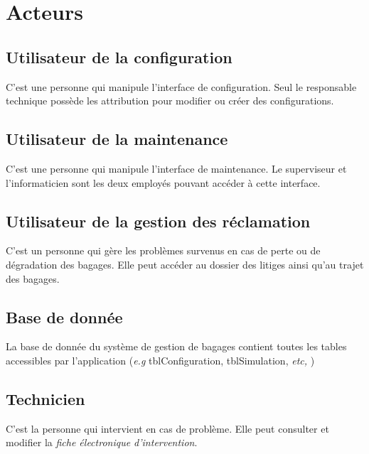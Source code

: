 \section{Acteurs}
\subsection{Utilisateur de la configuration}
C'est une personne qui manipule l'interface de configuration. Seul le responsable technique possède les attribution pour modifier ou créer des configurations.

\subsection{Utilisateur de la maintenance}
C'est une personne qui manipule l'interface de maintenance. Le superviseur et l'informaticien sont les deux employés pouvant accéder à cette interface.

\subsection{Utilisateur de la gestion des réclamation}
C'est un personne qui gère les problèmes survenus en cas de perte ou de dégradation des bagages. Elle peut accéder au dossier des litiges ainsi qu'au trajet des bagages.

\subsection{Base de donnée}
La base de donnée du système de gestion de bagages contient toutes les tables accessibles par l'application (\textsl{e.g} tblConfiguration, tblSimulation, \textsl{etc,} )


\subsection{Technicien}
C'est la personne qui intervient en cas de problème. Elle peut consulter et modifier la \textsl{fiche électronique d'intervention}.


